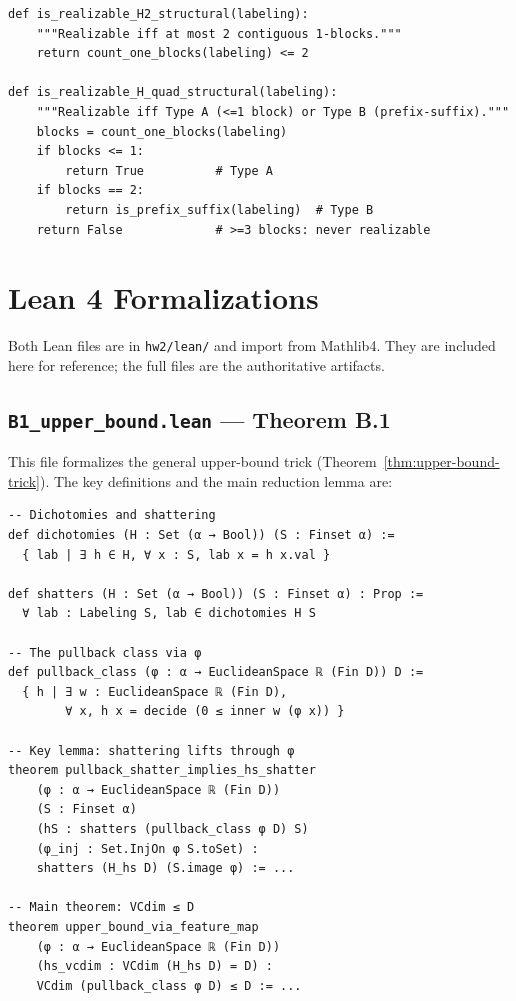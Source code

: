 \documentclass{article}
\begin{document}
\begin{small}
\begin{verbatim}
def is_realizable_H2_structural(labeling):
    """Realizable iff at most 2 contiguous 1-blocks."""
    return count_one_blocks(labeling) <= 2
 
def is_realizable_H_quad_structural(labeling):
    """Realizable iff Type A (<=1 block) or Type B (prefix-suffix)."""
    blocks = count_one_blocks(labeling)
    if blocks <= 1:
        return True          # Type A
    if blocks == 2:
        return is_prefix_suffix(labeling)  # Type B
    return False             # >=3 blocks: never realizable
\end{verbatim}
\end{small}
 
\section{Lean 4 Formalizations}
\label{app:lean}
 
Both Lean files are in \texttt{hw2/lean/} and import from Mathlib4.
They are included here for reference; the full files are the authoritative
artifacts.
 
\subsection{\texttt{B1\_upper\_bound.lean} --- Theorem B.1}
 
This file formalizes the general upper-bound trick
(Theorem~\ref{thm:upper-bound-trick}).  The key definitions and the main
reduction lemma are:
 
\begin{small}
\begin{verbatim}
-- Dichotomies and shattering
def dichotomies (H : Set (α → Bool)) (S : Finset α) :=
  { lab | ∃ h ∈ H, ∀ x : S, lab x = h x.val }
 
def shatters (H : Set (α → Bool)) (S : Finset α) : Prop :=
  ∀ lab : Labeling S, lab ∈ dichotomies H S
 
-- The pullback class via φ
def pullback_class (φ : α → EuclideanSpace ℝ (Fin D)) D :=
  { h | ∃ w : EuclideanSpace ℝ (Fin D),
        ∀ x, h x = decide (0 ≤ inner w (φ x)) }
 
-- Key lemma: shattering lifts through φ
theorem pullback_shatter_implies_hs_shatter
    (φ : α → EuclideanSpace ℝ (Fin D))
    (S : Finset α)
    (hS : shatters (pullback_class φ D) S)
    (φ_inj : Set.InjOn φ S.toSet) :
    shatters (H_hs D) (S.image φ) := ...
 
-- Main theorem: VCdim ≤ D
theorem upper_bound_via_feature_map
    (φ : α → EuclideanSpace ℝ (Fin D))
    (hs_vcdim : VCdim (H_hs D) = D) :
    VCdim (pullback_class φ D) ≤ D := ...
\end{verbatim}
\end{small}
 
\end{document}
